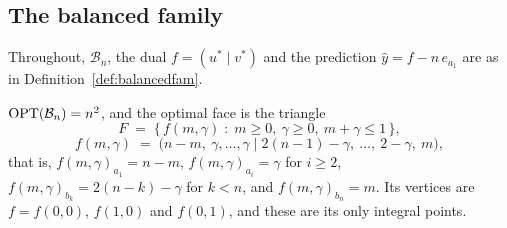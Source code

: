 \subsection{The balanced family}

Throughout, $\mathcal{B}_n$, the dual $f = (u^* \mid v^*)$ and the prediction $\hat y = f - n\,e_{a_1}$
are as in Definition~\ref{def:balancedfam}.

\begin{lemma}\label{lem:balancedface}
$\mathrm{OPT}(\mathcal{B}_n) = n^2$, and the optimal face is the triangle
\[
  F \;=\; \bigl\{\, f(m,\gamma) \;:\; m \ge 0,\ \gamma \ge 0,\ m + \gamma \le 1 \,\bigr\},
\]
\[
  f(m,\gamma) \;=\; \bigl(n - m,\ \gamma, \dots, \gamma \;\big|\; 2(n-1) - \gamma,\ \dots,\ 2 - \gamma,\ m\bigr),
\]
that is, $f(m,\gamma)_{a_1} = n - m$, $f(m,\gamma)_{a_i} = \gamma$ for $i \ge 2$, $f(m,\gamma)_{b_k} = 2(n-k) - \gamma$ for $k < n$, and $f(m,\gamma)_{b_n} = m$. Its vertices are $f = f(0,0)$, $f(1,0)$ and $f(0,1)$, and these are its only integral points.
\end{lemma}
